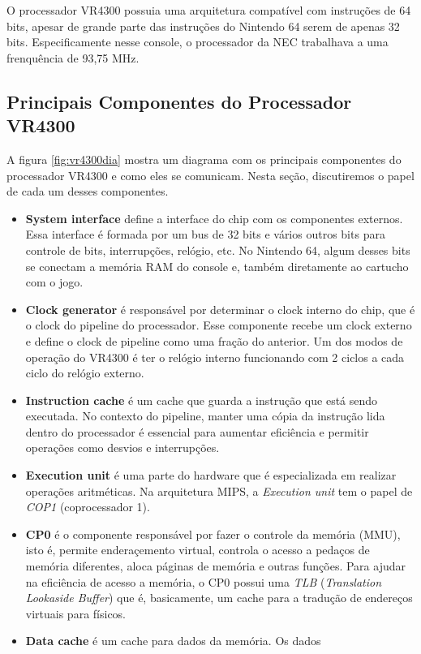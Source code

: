 \documentclass[12pt]{article}
\begin{document}
    O processador VR4300 possuia uma arquitetura compatível com 
instruções de 64 bits, apesar de grande parte das instruções do
Nintendo 64 serem de apenas 32 bits. Especificamente nesse console, o
processador da NEC trabalhava a uma frenquência de 93,75 MHz.

\subsection{Principais Componentes do Processador VR4300}
    A figura \ref{fig:vr4300dia} mostra um diagrama com os principais
componentes do processador VR4300 e como eles se comunicam. Nesta seção,
discutiremos o papel de cada um desses componentes.
\begin{itemize}
    \item {\bf System interface} define a interface do chip com os
componentes externos. Essa interface é formada por um bus de 32 bits
e vários outros bits para controle de bits, interrupções, relógio, etc.
No Nintendo  64, algum desses bits se conectam a memória RAM do console
e, também diretamente ao cartucho com o jogo.
    \item {\bf Clock generator} é responsável por determinar o clock
interno do chip, que é o clock do pipeline do processador. Esse 
componente recebe um clock externo e define o clock de pipeline como uma
fração do anterior. Um dos modos de operação do VR4300 é ter o relógio 
interno funcionando com 2 ciclos a cada ciclo do relógio externo.
    \item {\bf Instruction cache} é um cache que guarda a instrução que
está sendo executada. No contexto do pipeline, manter uma cópia da 
instrução lida dentro do processador é essencial para aumentar 
eficiência e permitir operações como desvios e interrupções.
    \item {\bf Execution unit} é uma parte do hardware que é 
especializada em realizar operações aritméticas. Na arquitetura MIPS,
a {\em Execution unit} tem o papel de {\em COP1} (coprocessador 1).
    \item {\bf CP0} é o componente responsável por fazer o controle da
memória (MMU), isto é, permite enderaçemento virtual, controla o acesso
a pedaços de memória diferentes, aloca páginas de memória e outras 
funções. Para ajudar na eficiência de acesso a memória, o {\em} CP0 
possui uma {\em TLB} ({\em Translation Lookaside Buffer}) que é, 
basicamente, um cache para a tradução de endereços virtuais para 
físicos.
    \item {\bf Data cache} é um cache para dados da memória. Os dados 

\end{itemize}
\end{document}
